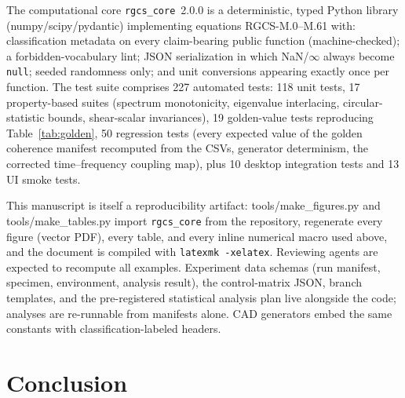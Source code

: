 \documentclass[10pt,letterpaper]{article}
\begin{document}
The computational core \texttt{rgcs\_core}~2.0.0 \citep{rgcscore2026} is a
deterministic, typed Python library (numpy/scipy/pydantic) implementing
equations RGCS-M.0--M.61 with: classification metadata on every
claim-bearing public function (machine-checked); a forbidden-vocabulary
lint; JSON serialization in which NaN/$\infty$ always become \texttt{null};
seeded randomness only; and unit conversions appearing exactly once per
function. The test suite comprises 227 automated tests: 118 unit tests,
17 property-based suites (spectrum monotonicity, eigenvalue interlacing,
circular-statistic bounds, shear-scalar invariances), 19 golden-value
tests reproducing Table~\ref{tab:golden}, 50 regression tests (every
expected value of the golden coherence manifest recomputed from the CSVs,
generator determinism, the corrected time--frequency coupling map), plus
10 desktop integration tests and 13 UI smoke tests.

This manuscript is itself a reproducibility artifact: {\ttfamily
tools/make\_figures.py} and {\ttfamily tools/make\_tables.py} import
\texttt{rgcs\_core} from the repository, regenerate every figure (vector
PDF), every table, and every inline numerical macro used above, and the
document is compiled with \texttt{latexmk -xelatex}. Reviewing agents are
expected to recompute all examples. Experiment data schemas (run manifest,
specimen, environment, analysis result), the control-matrix JSON, branch
templates, and the pre-registered statistical analysis plan live alongside
the code; analyses are re-runnable from manifests alone. CAD generators
\citep{greenscad2026,greenspiralscad2026} embed the same constants with
classification-labeled headers.

\section{Conclusion}\label{sec:conclusion}
\end{document}
